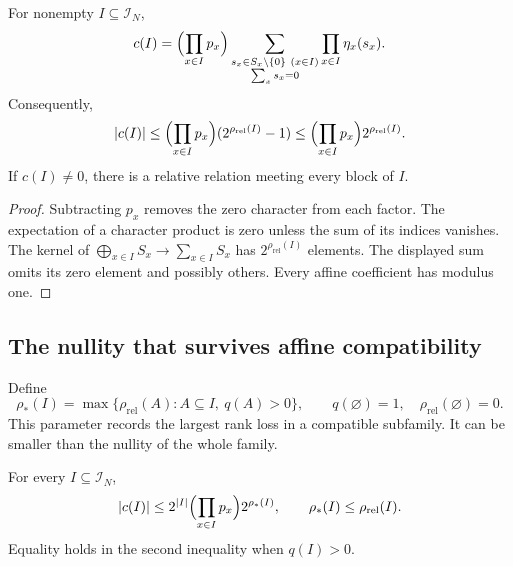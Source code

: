 \begin{lemma}
\label{p1:alg:fourier}
For nonempty \(I\subseteq\mathcal I_N\),
\begin{equation}
 c(I)=\Bigl(\prod_{x\in I}p_x\Bigr)
   \sum_{\substack{s_x\in S_x\setminus\{0\}\ (x\in I)\\
                         \sum_xs_x=0}}
                 \prod_{x\in I}\eta_x(s_x).
 \label{p1:alg:fourier-identity}
\end{equation}
Consequently,
\[
 |c(I)|\le\Bigl(\prod_{x\in I}p_x\Bigr)(2^{\rho_{\mathrm{rel}}(I)}-1)
           \le\Bigl(\prod_{x\in I}p_x\Bigr)2^{\rho_{\mathrm{rel}}(I)}.
\]
If \(c(I)\ne0\), there is a relative relation meeting
every block of \(I\).
\end{lemma}

\begin{proof}
Subtracting \(p_x\) removes the zero character from each
factor. The expectation of a character product is zero
unless the sum of its indices vanishes. The kernel of
\(\bigoplus_{x\in I}S_x\to\sum_{x\in I}S_x\) has
\(2^{\rho_{\mathrm{rel}}(I)}\) elements. The displayed sum omits its
zero element and possibly others. Every affine
coefficient has modulus one.
\end{proof}

\subsection{The nullity that survives affine compatibility}

Define
\begin{equation}
 \rho_*(I)=\max\{\rho_{\mathrm{rel}}(A):A\subseteq I,\ q(A)>0\},
 \qquad q(\varnothing)=1,\quad\rho_{\mathrm{rel}}(\varnothing)=0 .
 \label{p1:alg:compatible-nullity}
\end{equation}
This parameter records the largest rank loss in a
compatible subfamily. It can be smaller than the
nullity of the whole family.

\begin{lemma}
\label{p1:alg:compatible}
For every \(I\subseteq\mathcal I_N\),
\begin{equation}
 |c(I)|\le 2^{|I|}\Bigl(\prod_{x\in I}p_x\Bigr)2^{\rho_*(I)},\qquad
 \rho_*(I)\le\rho_{\mathrm{rel}}(I).
 \label{p1:alg:compatible-bound}
\end{equation}
Equality holds in the second inequality when \(q(I)>0\).
\end{lemma}

